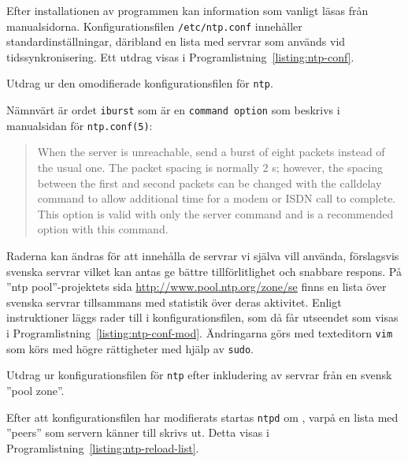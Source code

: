 Efter installationen av programmen kan information som vanligt läsas från
manualsidorna. Konfigurationsfilen \texttt{/etc/ntp.conf} innehåller
standardinställningar, däribland en lista med servrar som används vid
tidssynkronisering. Ett utdrag visas i Programlistning~\ref{listing:ntp-conf}.

\begin{listing}[H]
\caption{Utdrag ur den omodifierade konfigurationsfilen för \texttt{ntp}.}
\label{listing:ntp-conf}
\end{listing}

Nämnvärt är ordet \texttt{iburst} som är en \texttt{command option} som 
beskrivs i manualsidan för \texttt{ntp.conf(5)}:

\begin{quotation}
When  the  server  is  unreachable, send a burst of eight packets
instead of the usual one.  The packet spacing is normally 2 s; however, the
spacing between the first and second packets can be changed with the calldelay
command to allow additional time for a modem or ISDN call to  complete.   This
option is valid with only the server command and is a recommended option with
this command.
\end{quotation}


Raderna kan ändras för att innehålla de servrar vi själva vill använda,
förslagsvis svenska servrar vilket kan antas ge bättre tillförlitlighet och
snabbare respons. 
På ''ntp pool''-projektets sida \url{http://www.pool.ntp.org/zone/se} finns en
lista över svenska servrar tillsammans med statistik över deras aktivitet.
Enligt instruktioner \cite{ntp:pool-use} läggs rader till i
konfigurationsfilen, som då får utseendet som visas i
Programlistning~\ref{listing:ntp-conf-mod}.  Ändringarna görs med texteditorn
\texttt{vim} som körs med högre rättigheter med hjälp av \texttt{sudo}.

\begin{listing}[H]
\caption{Utdrag ur konfigurationsfilen för \texttt{ntp} efter inkludering av
servrar från en svensk ''pool zone''.}
\label{listing:ntp-conf-mod}
\end{listing}


Efter att konfigurationsfilen har modifierats startas \texttt{ntpd} om
\cite{ubuntu:ntp-serverguide}, varpå en lista med ''peers'' som servern känner
till skrivs ut. Detta visas i Programlistning~\ref{listing:ntp-reload-list}.

